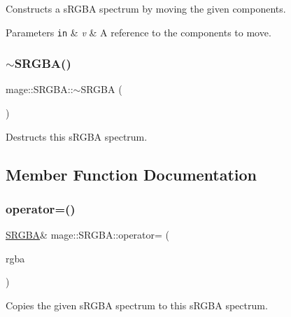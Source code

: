 Constructs a s\+R\+G\+BA spectrum by moving the given components.


\begin{DoxyParams}[1]{Parameters}
\mbox{\tt in}  & {\em v} & A reference to the components to move. \\
\hline
\end{DoxyParams}
\hypertarget{structmage_1_1_s_r_g_b_a_a1a3df218eb9077b50380b831dbbfc753}{}\label{structmage_1_1_s_r_g_b_a_a1a3df218eb9077b50380b831dbbfc753} 
\subsubsection{\texorpdfstring{$\sim$\+S\+R\+G\+B\+A()}{~SRGBA()}}
{\footnotesize\ttfamily mage\+::\+S\+R\+G\+B\+A\+::$\sim$\+S\+R\+G\+BA (\begin{DoxyParamCaption}{ }\end{DoxyParamCaption})\hspace{0.3cm}{\ttfamily [default]}}

Destructs this s\+R\+G\+BA spectrum. 

\subsection{Member Function Documentation}
\hypertarget{structmage_1_1_s_r_g_b_a_a36892da1f5f11365241fc0b0e9f72ac5}{}\label{structmage_1_1_s_r_g_b_a_a36892da1f5f11365241fc0b0e9f72ac5} 
\subsubsection{\texorpdfstring{operator=()}{operator=()}\hspace{0.1cm}{\footnotesize\ttfamily [1/2]}}
{\footnotesize\ttfamily \hyperlink{structmage_1_1_s_r_g_b_a}{S\+R\+G\+BA}\& mage\+::\+S\+R\+G\+B\+A\+::operator= (\begin{DoxyParamCaption}\item[{const \hyperlink{structmage_1_1_s_r_g_b_a}{S\+R\+G\+BA} \&}]{rgba }\end{DoxyParamCaption})\hspace{0.3cm}{\ttfamily [default]}}

Copies the given s\+R\+G\+BA spectrum to this s\+R\+G\+BA spectrum.


